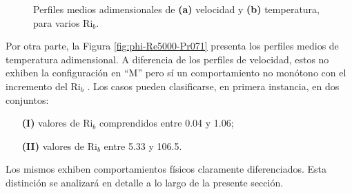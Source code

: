 \begin{figure}[H]
  \centering
  \caption{Perfiles medios adimensionales de \textbf{(a)} velocidad y \textbf{(b)} temperatura, para varios Ri$_b$.}
\end{figure}

Por otra parte, la Figura \ref{fig:phi-Re5000-Pr071} presenta los perfiles medios de temperatura adimensional. A diferencia de los perfiles de velocidad, estos no exhiben la configuración en ``M'' pero sí un comportamiento no monótono con el incremento del Ri$_b$ \cite{you2003direct, steiner1971reverse}. Los casos pueden clasificarse, en primera instancia, en dos conjuntos:

\begin{itemize}

\item[\textbf{(I)}] valores de Ri$_b$ comprendidos entre 0.04 y 1.06;

\item[\textbf{(II)}] valores de Ri$_b$ entre 5.33 y 106.5.

\end{itemize}
Los mismos exhiben comportamientos físicos claramente diferenciados. Esta distinción se analizará en detalle a lo largo de la presente sección.

